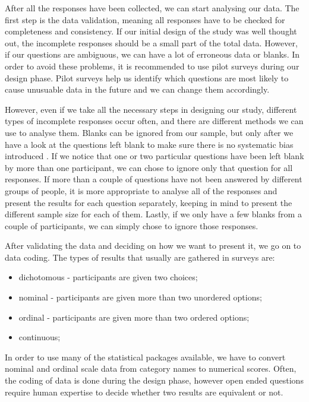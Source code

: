 \documentclass{report}
\begin{document}
After all the responses have been collected, we can start analysing our data. The first step is the data validation, meaning all responses have to be checked for completeness and consistency. If our initial design of the study was well thought out, the incomplete responses should be a small part of the total data. However, if our questions are ambiguous, we can have a lot of erroneous data or blanks. In order to avoid these problems, it is recommended to use pilot surveys during our design phase. Pilot surveys help us identify which questions are most likely to cause unusuable data in the future and we can change them accordingly. 

However, even if we take all the necessary steps in designing our study, different types of incomplete responses occur often, and there are different methods we can use to analyse them. Blanks can be ignored from our sample, but only after we have a look at the questions left blank to make sure there is no systematic bias introduced \cite{Kitchenham6}. If we notice that one or two particular questions have been left blank by more than one participant, we can chose to ignore only that question for all responses. If more than a couple of questions have not been answered by different groups of people, it is more appropriate to analyse all of the responses and present the results for each question separately, keeping in mind to present the different sample size for each of them. Lastly, if we only have a few blanks from a couple of participants, we can simply chose to ignore those responses.

After validating the data and deciding on how we want to present it, we go on to data coding. The types of results that usually are gathered in surveys are:
\begin{itemize}
\item dichotomous - participants are given two choices;\\
\item nominal - participants are given more than two unordered options;\\
\item ordinal - participants are given more than two ordered options;\\
\item continuous;
\end{itemize} 
In order to use many of the statistical packages available, we have to convert nominal and ordinal scale data from category names to numerical scores. Often, the coding of data is done during the design phase, however open ended questions require human expertise to decide whether two results are equivalent or not. 
\end{document}
